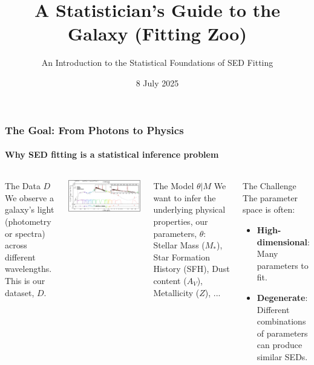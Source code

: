 \documentclass[aspectratio=169]{beamer}
\title{A Statistician's Guide to the Galaxy (Fitting Zoo)}
\subtitle{An Introduction to the Statistical Foundations of SED Fitting}
\date{8 July 2025}
\newcommand{\keyterm}[1]{\textbf{\textcolor{C0}{#1}}}
\begin{document}
\begin{frame}
    \titlepage
\end{frame}

\begin{frame}
    \frametitle{The Goal: From Photons to Physics}
    \framesubtitle{Why SED fitting is a statistical inference problem}
    \begin{columns}[T]
        \begin{block}{The Data $D$}
            We observe a galaxy's light (photometry or spectra) across different wavelengths. This is our dataset, $D$.
        \end{block}
        \includegraphics[width=\textwidth]{figures/sed.png}
        \begin{block}{The Model $\theta|M$}
            We want to infer the underlying physical properties, our parameters, $\theta$: Stellar Mass ($M_*$), Star Formation History (SFH), Dust content ($A_V$), Metallicity ($Z$), ...
        \end{block}
        \begin{block}{The Challenge}
            The parameter space is often:
            \begin{itemize}
                \item \keyterm{High-dimensional}: Many parameters to fit.
                \item \keyterm{Degenerate}: Different combinations of parameters can produce similar SEDs.
            \end{itemize}
        \end{block}
    \end{columns}
\end{frame}
\end{document}
